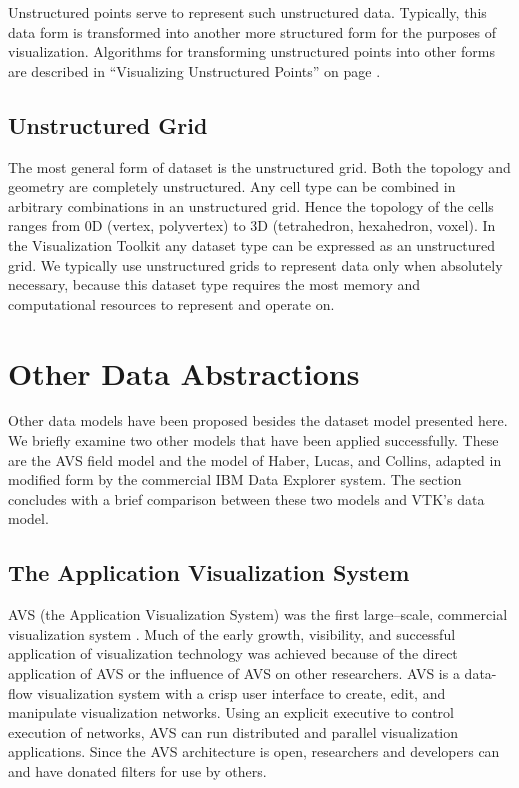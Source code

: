 Unstructured points serve to represent such unstructured data. Typically, this data form is transformed into another more structured form for the purposes of visualization. Algorithms for transforming unstructured points into other forms are described in ``Visualizing Unstructured Points'' on page \pageref{subsec:visualizing_unstructured_points}.

\subsection{Unstructured Grid}

The most general form of dataset is the unstructured grid. Both the topology and geometry are completely unstructured. Any cell type can be combined in arbitrary combinations in an unstructured grid. Hence the topology of the cells ranges from 0D (vertex, polyvertex) to 3D (tetrahedron, hexahedron, voxel). In the Visualization Toolkit any dataset type can be expressed as an unstructured grid. We typically use unstructured grids to represent data only when absolutely necessary, because this dataset type requires the most memory and computational resources to represent and operate on.


\section{Other Data Abstractions}
\label{sec:other_data_abstractions}

Other data models have been proposed besides the dataset model presented here. We briefly examine two other models that have been applied successfully. These are the AVS field model and the model of Haber, Lucas, and Collins, adapted in modified form by the commercial IBM Data Explorer system. The section concludes with a brief comparison between these two models and VTK's data model.

\subsection{The Application Visualization System}

AVS (the Application Visualization System) was the first large--scale, commercial visualization system \cite{AVS89}. Much of the early growth, visibility, and successful application of visualization technology was achieved because of the direct application of AVS or the influence of AVS on other researchers. AVS is a data-flow visualization system with a crisp user interface to create, edit, and manipulate visualization networks. Using an explicit executive to control execution of networks, AVS can run distributed and parallel visualization applications. Since the AVS architecture is open, researchers and developers can and have donated filters for use by others.

